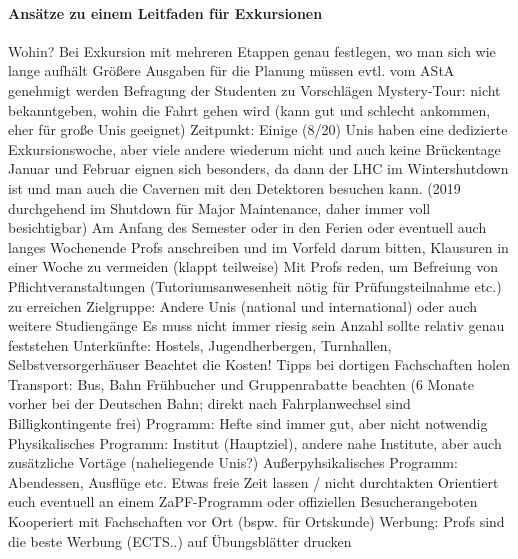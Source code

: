     \paragraph{Ansätze zu einem Leitfaden für Exkursionen}
      \begin{outline}
        \1 Wohin?
          \2 Bei Exkursion mit mehreren Etappen genau festlegen, wo man sich wie lange aufhält
          \2 Größere Ausgaben für die Planung müssen evtl. vom AStA genehmigt werden
          \2 Befragung der Studenten zu Vorschlägen
          \2 Mystery-Tour: nicht bekanntgeben, wohin die Fahrt gehen wird (kann gut und schlecht ankommen, eher für große Unis geeignet)
        \1 Zeitpunkt:
          \2 Einige (8/20) Unis haben eine dedizierte Exkursionswoche, aber viele andere wiederum nicht und auch keine Brückentage
          \2 Januar und Februar eignen sich besonders, da dann der LHC im Wintershutdown ist und man auch die Cavernen mit den Detektoren besuchen kann. (2019 durchgehend im Shutdown für Major Maintenance, daher immer voll besichtigbar)
          \2 Am Anfang des Semester oder in den Ferien oder eventuell auch langes Wochenende
          \2 Profs anschreiben und im Vorfeld darum bitten, Klausuren in einer Woche zu vermeiden (klappt teilweise)
          \2 Mit Profs reden, um Befreiung von Pflichtveranstaltungen (Tutoriumsanwesenheit nötig für Prüfungsteilnahme etc.) zu erreichen
        \1 Zielgruppe:
          \2 Andere Unis (national und international) oder auch weitere Studiengänge
          \2 Es muss nicht immer riesig sein
          \2 Anzahl sollte relativ genau feststehen
        \1 Unterkünfte:
          \2 Hostels, Jugendherbergen, Turnhallen, Selbstversorgerhäuser
          \2 Beachtet die Kosten!
          \2 Tipps bei dortigen Fachschaften holen
        \1 Transport:
          \2 Bus, Bahn
          \2 Frühbucher und Gruppenrabatte beachten (6 Monate vorher bei der Deutschen Bahn; direkt nach Fahrplanwechsel sind Billigkontingente frei)
        \1 Programm:
          \2 Hefte sind immer gut, aber nicht notwendig
          \2 Physikalisches Programm: Institut (Hauptziel), andere nahe Institute, aber auch zusätzliche Vortäge (naheliegende Unis?)
          \2 Außerpyhsikalisches Programm: Abendessen, Ausflüge etc.
          \2 Etwas freie Zeit lassen / nicht durchtakten
          \2 Orientiert euch eventuell an einem ZaPF-Programm oder offiziellen Besucherangeboten
          \2 Kooperiert mit Fachschaften vor Ort (bspw. für Ortskunde)
        \1 Werbung:
          \2 Profs sind die beste Werbung (ECTS..)
          \2 auf Übungsblätter drucken

\end{outline}
